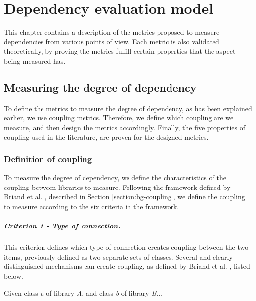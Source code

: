 \chapter{Dependency evaluation model}\label{ch:TheoreticModel}
This chapter contains a description of the metrics proposed to measure dependencies from various points of view. Each metric is also validated theoretically, by proving the metrics fulfill certain properties that the aspect being measured has.

\section{Measuring the degree of dependency}\label{sect:degree-dependency}
To define the metrics to measure the degree of dependency, as has been explained earlier, we use coupling metrics. Therefore, we define which coupling are we measure, and then design the metrics accordingly. Finally, the five properties of coupling used in the literature, are proven for the designed metrics.

\subsection{Definition of coupling}\label{subsect:defCoupling}
To measure the degree of dependency, we define the characteristics of the coupling between libraries to measure. Following the framework defined by Briand et al. \cite{briand1999unified}, described in Section \ref{section:bg-coupling}, we define the coupling to measure according to the six criteria in the framework.

\paragraph{Criterion 1 - Type of connection:}
This criterion defines which type of connection creates coupling between the two items, previously defined as two separate sets of classes. Several and clearly distinguished mechanisms can create coupling, as defined by Briand et al. \cite{briand1999unified}, listed below.

\blankls
Given class \textit{a} of library \textit{A}, and class \textit{b} of library \textit{B}...

